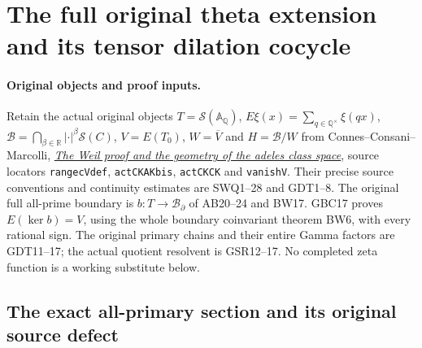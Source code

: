 \section{The full original theta extension and its tensor dilation cocycle}
\label{sec:global-theta-extension-cocycle}

\paragraph{Original objects and proof inputs.}
Retain the actual original objects $T=\mathcal S(\mathbb A_{\mathbb Q})$,
$E\xi(x)=\sum_{q\in\mathbb Q^\times}\xi(qx)$,
$\mathscr B=\bigcap_{\beta\in\mathbb R}|\cdot|^\beta\mathcal S(C)$,
$V=E(T_0)$, $W=\overline V$ and $H=\mathscr B/W$ from
Connes--Consani--Marcolli,
\href{https://arxiv.org/abs/math/0703392v1}{\emph{The Weil proof and
the geometry of the adeles class space}}, source locators
\texttt{rangecVdef}, \texttt{actCKAKbis}, \texttt{actCKCK}
and \texttt{vanishV}. Their precise source conventions and
continuity estimates are SWQ1--28 and GDT1--8.
The original full all-prime boundary is $b:T\to\mathcal B_\partial$
of AB20--24 and BW17. GBC17 proves $E(\ker b)=V$, using the
whole boundary coinvariant theorem BW6, with every rational sign.
The original primary chains and their entire Gamma factors are
GDT11--17; the actual quotient resolvent is GSR12--17.
No completed zeta function is a working substitute below.

\subsection{The exact all-primary section and its original source defect}

